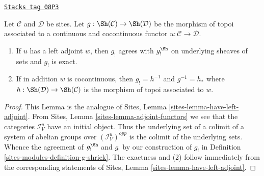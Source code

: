 \begin{lemma}
\label{sites-modules-lemma-have-left-adjoint}
\href{https://stacks.math.columbia.edu/tag/08P3}{\texttt{Stacks tag 08P3}}

Let $\mathcal{C}$ and $\mathcal{D}$ be sites. Let
$g : \Sh(\mathcal{C}) \to \Sh(\mathcal{D})$ be the morphism of topoi
associated to a continuous and cocontinuous functor
$u : \mathcal{C} \to \mathcal{D}$.
\begin{enumerate}
\item If $u$ has a left adjoint $w$, then $g_!$ agrees with $g_!^{\Sh}$
on underlying sheaves of sets and $g_!$ is exact.
\item If in addition $w$ is cocontinuous, then $g_! = h^{-1}$ and
$g^{-1} = h_*$ where
$h : \Sh(\mathcal{D}) \to \Sh(\mathcal{C})$ is the morphism of topoi
associated to $w$.
\end{enumerate}
\end{lemma}

\begin{proof}
This Lemma is the analogue of
Sites, Lemma \ref{sites-lemma-have-left-adjoint}.
From Sites, Lemma \ref{sites-lemma-adjoint-functors} we see that the categories
$\mathcal{I}_V^u$ have an initial object. Thus the underlying set of a
colimit of a system of abelian groups over $(\mathcal{I}_V^u)^{opp}$
is the colimit of the underlying sets. Whence the agreement
of $g_!^{\Sh}$ and $g_!$ by our construction of $g_!$ in
Definition \ref{sites-modules-definition-g-shriek}.
The exactness and (2) follow immediately from the corresponding statements of
Sites, Lemma \ref{sites-lemma-have-left-adjoint}.
\end{proof}

